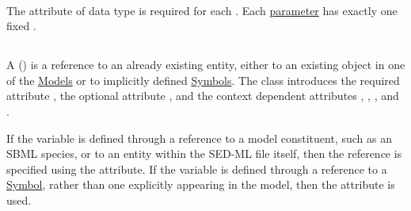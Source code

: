 \paragraph*{}
\label{sec:value}
The  attribute of data type  is required for each . Each \hyperref[class:parameter]{parameter} has exactly one fixed . 


\subsection{}
\label{class:variable}
A  () is a reference to an already existing entity, either to an existing object in one of the \hyperref[class:model]{Models} or to implicitly defined \hyperref[sec:symbol]{Symbols}. The  class introduces the required attribute \hyperref[sec:id]{}, the optional attribute \hyperref[sec:name]{}, and the context dependent attributes \hyperref[sec:target]{}, \hyperref[sec:symbol]{}, \hyperref[sec:taskReferenceAttribute]{}, and \hyperref[sec:modelReferenceAttribute]{}.


If the variable is defined through a reference to a model constituent, such as an SBML species, or to an entity within the SED-ML file itself, then the reference is specified using the \hyperref[sec:target]{} attribute. If the variable is defined through a reference to a \hyperref[sec:implicitVariable]{Symbol}, rather than one explicitly appearing in the model, then the \hyperref[sec:symbol]{} attribute is used. 

